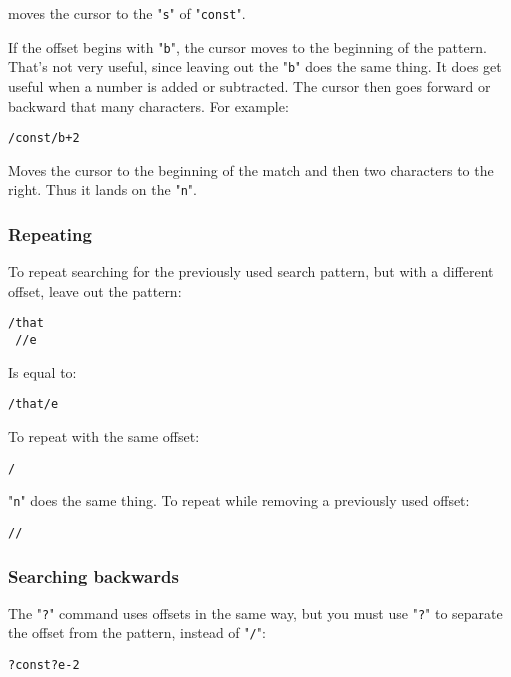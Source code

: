 moves the cursor to the "\verb!s!" of "\verb!const!".

If the offset begins with "\verb!b!", the cursor moves to the beginning of the pattern.
That's not very useful, since leaving out the "\verb!b!" does the same thing.
It does get useful when a number is added or subtracted.
The cursor then goes forward or backward that many characters.
For example:

\begin{Verbatim}[samepage=true]
 /const/b+2
\end{Verbatim}

Moves the cursor to the beginning of the match and then two characters to the right.
Thus it lands on the "\verb!n!".

\subsubsection{Repeating}
To repeat searching for the previously used search pattern, but with a different offset, leave out the pattern:

\begin{Verbatim}[samepage=true]
 /that
 //e
\end{Verbatim}

Is equal to:

\begin{Verbatim}[samepage=true]
 /that/e
\end{Verbatim}

To repeat with the same offset:

\begin{Verbatim}[samepage=true]
 /
\end{Verbatim}

"\verb!n!" does the same thing.
To repeat while removing a previously used offset:

\begin{Verbatim}[samepage=true]
 //
\end{Verbatim}

\subsubsection{Searching backwards}
The "\verb!?!" command uses offsets in the same way, but you must use "\verb!?!" to separate the offset from the pattern, instead of "\verb!/!":

\begin{Verbatim}[samepage=true]
 ?const?e-2
\end{Verbatim}

